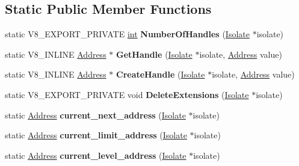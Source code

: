 \subsection*{Static Public Member Functions}
\begin{DoxyCompactItemize}
\item 
\mbox{\label{classv8_1_1internal_1_1HandleScope_a24b3e5fe5858089d5f677b6e81fb17b4}} 
static V8\+\_\+\+E\+X\+P\+O\+R\+T\+\_\+\+P\+R\+I\+V\+A\+TE \mbox{\hyperlink{classint}{int}} {\bfseries Number\+Of\+Handles} (\mbox{\hyperlink{classv8_1_1internal_1_1Isolate}{Isolate}} $\ast$isolate)
\item 
\mbox{\label{classv8_1_1internal_1_1HandleScope_ab14ab0c8aa1f3c87200a246dfbabeb39}} 
static V8\+\_\+\+I\+N\+L\+I\+NE \mbox{\hyperlink{classuintptr__t}{Address}} $\ast$ {\bfseries Get\+Handle} (\mbox{\hyperlink{classv8_1_1internal_1_1Isolate}{Isolate}} $\ast$isolate, \mbox{\hyperlink{classuintptr__t}{Address}} value)
\item 
\mbox{\label{classv8_1_1internal_1_1HandleScope_aaa41d7957b4fee82fded13453ed0f29e}} 
static V8\+\_\+\+I\+N\+L\+I\+NE \mbox{\hyperlink{classuintptr__t}{Address}} $\ast$ {\bfseries Create\+Handle} (\mbox{\hyperlink{classv8_1_1internal_1_1Isolate}{Isolate}} $\ast$isolate, \mbox{\hyperlink{classuintptr__t}{Address}} value)
\item 
\mbox{\label{classv8_1_1internal_1_1HandleScope_a49d50c5b71e4d3aed324e3ce63bb681d}} 
static V8\+\_\+\+E\+X\+P\+O\+R\+T\+\_\+\+P\+R\+I\+V\+A\+TE void {\bfseries Delete\+Extensions} (\mbox{\hyperlink{classv8_1_1internal_1_1Isolate}{Isolate}} $\ast$isolate)
\item 
\mbox{\label{classv8_1_1internal_1_1HandleScope_a4ab0caf3631e3b3f5aa40d20696ca6cc}} 
static \mbox{\hyperlink{classuintptr__t}{Address}} {\bfseries current\+\_\+next\+\_\+address} (\mbox{\hyperlink{classv8_1_1internal_1_1Isolate}{Isolate}} $\ast$isolate)
\item 
\mbox{\label{classv8_1_1internal_1_1HandleScope_a49204b2b24d948e6a4b2cec31f043a0c}} 
static \mbox{\hyperlink{classuintptr__t}{Address}} {\bfseries current\+\_\+limit\+\_\+address} (\mbox{\hyperlink{classv8_1_1internal_1_1Isolate}{Isolate}} $\ast$isolate)
\item 
\mbox{\label{classv8_1_1internal_1_1HandleScope_ad8e3d2e7853cee42d7d255e45afb1f5e}} 
static \mbox{\hyperlink{classuintptr__t}{Address}} {\bfseries current\+\_\+level\+\_\+address} (\mbox{\hyperlink{classv8_1_1internal_1_1Isolate}{Isolate}} $\ast$isolate)
\end{DoxyCompactItemize}
